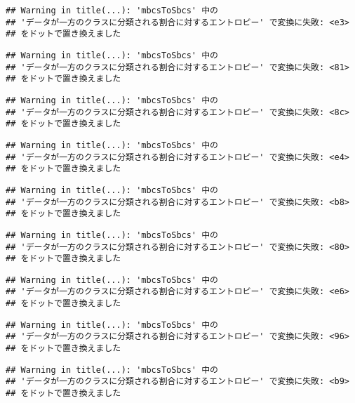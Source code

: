 \documentclass[
]{article}
\begin{document}
\begin{verbatim}
## Warning in title(...): 'mbcsToSbcs' 中の
## 'データが一方のクラスに分類される割合に対するエントロピー' で変換に失敗: <e3>
## をドットで置き換えました
\end{verbatim}

\begin{verbatim}
## Warning in title(...): 'mbcsToSbcs' 中の
## 'データが一方のクラスに分類される割合に対するエントロピー' で変換に失敗: <81>
## をドットで置き換えました
\end{verbatim}

\begin{verbatim}
## Warning in title(...): 'mbcsToSbcs' 中の
## 'データが一方のクラスに分類される割合に対するエントロピー' で変換に失敗: <8c>
## をドットで置き換えました
\end{verbatim}

\begin{verbatim}
## Warning in title(...): 'mbcsToSbcs' 中の
## 'データが一方のクラスに分類される割合に対するエントロピー' で変換に失敗: <e4>
## をドットで置き換えました
\end{verbatim}

\begin{verbatim}
## Warning in title(...): 'mbcsToSbcs' 中の
## 'データが一方のクラスに分類される割合に対するエントロピー' で変換に失敗: <b8>
## をドットで置き換えました
\end{verbatim}

\begin{verbatim}
## Warning in title(...): 'mbcsToSbcs' 中の
## 'データが一方のクラスに分類される割合に対するエントロピー' で変換に失敗: <80>
## をドットで置き換えました
\end{verbatim}

\begin{verbatim}
## Warning in title(...): 'mbcsToSbcs' 中の
## 'データが一方のクラスに分類される割合に対するエントロピー' で変換に失敗: <e6>
## をドットで置き換えました
\end{verbatim}

\begin{verbatim}
## Warning in title(...): 'mbcsToSbcs' 中の
## 'データが一方のクラスに分類される割合に対するエントロピー' で変換に失敗: <96>
## をドットで置き換えました
\end{verbatim}

\begin{verbatim}
## Warning in title(...): 'mbcsToSbcs' 中の
## 'データが一方のクラスに分類される割合に対するエントロピー' で変換に失敗: <b9>
## をドットで置き換えました
\end{verbatim}
\end{document}
